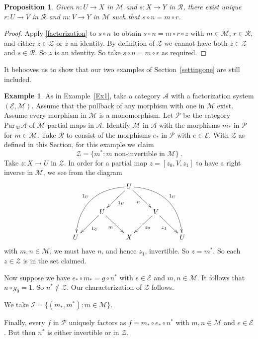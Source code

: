 \documentclass[a4paper,12pt,reqno]{amsart}
\newtheorem{proposition}[theorem]{Proposition}
\theoremstyle{definition}
\newtheorem{example}[theorem]{Example}
\theoremstyle{fact}
\theoremstyle{genquest}
\theoremstyle{step}
\newcommand{\lra}{\longrightarrow}
\newcommand{\ra}{\rightarrow}
\def\CA{{\mathscr A}}
\def\CE{{\mathscr E}}
\def\CI{{\mathscr I}}
\def\CM{{\mathscr M}}
\def\CP{{\mathscr P}}
\def\CR{{\mathscr R}}
\def\CZ{{\mathscr Z}}
\begin{document}
\begin{proposition}
Given $n : U \ra X$ in $\CM$ and $s : X \ra Y$ in $\CR$, there exist
unique $r : U \ra V$ in $\CR$ and $m:V\ra Y$ in $\CM$ such that 
$s\circ n = m\circ r$. 
\end{proposition}
\begin{proof}
Apply \eqref{factorization} to $s\circ n$ to obtain $s\circ n = m\circ r \circ z$
with $m\in \CM$, $r\in \CR$, and either $z \in \CZ$ or $z$ an identity.
By definition of $\CZ$ we cannot have both $z \in \CZ$ and $s\in \CR$.
So $z$ is an identity. So take $s\circ n = m\circ r$ as required.    
\end{proof}

It behooves us to show that our two examples of Section~\ref{settingone}
are still included. 

\begin{example}\label{Ex1+}
As in Example~\ref{Ex1}, take a category $\CA$ with a factorization 
system $(\CE,\CM)$. 
Assume that the pullback of any morphism with one in $\CM$ exist. 
Assume every morphism in $\CM$ is a monomorphism. 
Let $\CP$ be the category $\mathrm{Par}_{\CM}\CA$ of $\CM$-partial maps in $\CA$.
Identify $\CM$ in $\CA$ with the morphisms $m_*$ in $\CP$ for $m\in \CM$.
Take $\CR$ to consist of the morphisms $e_*$ in $\CP$ with $e\in \CE$.
With $\CZ$ as defined in this Section, for this example we claim
$$\CZ = \{m^* : m \text{ non-invertible in } \CM \} \ . $$
Take $z : X \lra U$ in $\CZ$. In order for a partial map $z = [z_0,V,z_1]$ to have 
a right inverse in $\CM$,
we see from the diagram
\begin{equation*}
\xymatrix{
& & U \ar[ld]^-{1_U} \ar@/_2pc/[lldd]_-{1_U} \ar[rd]_-{n} \ar@/^2pc/[rrdd]^-{1_U} \\
& U \ar[ld]^-{1_U} \ar[rd]_-{m} & & V \ar[rd]_-{z_1} \ar[ld]^-{z_0} \\
U & & X & & U}
\end{equation*}
with $m,n\in \CM$, we must have $n$, and hence $z_1$, invertible. So $z = m^*$.
So each $z\in \CZ$ is in the set claimed.

Now suppose we have $e_*\circ m_* = g \circ n^*$ with $e\in \CE$ and $m,n\in \CM$.
It follows that $n\circ g_0 = 1$. So $n^*\notin \CZ$.  
Our characterization of $\CZ$ follows.

We take $\CI = \{(m_*,m^*) : m\in \CM \}$.

Finally, every $f$ in $\CP$ uniquely factors as $f = m_*\circ e_* \circ n^*$ with
$m,n\in \CM$ and $e\in \CE$. But then $n^*$ is either invertible or in $\CZ$.    
\end{example}
\end{document}
